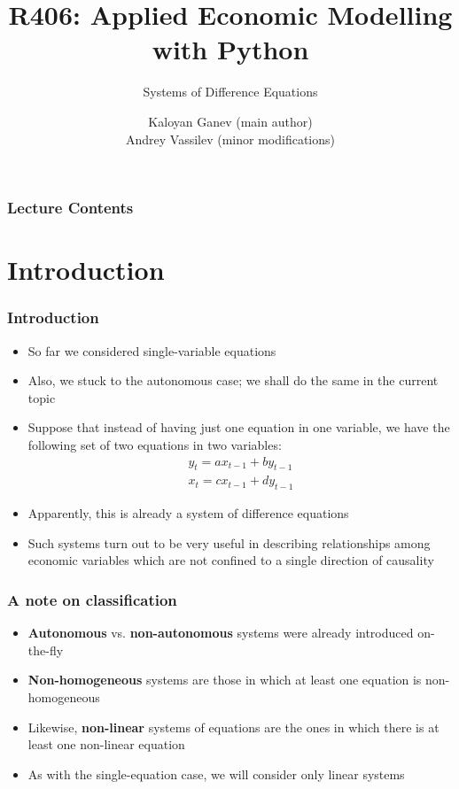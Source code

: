 \documentclass[10pt,usenames,dvipsnames]{beamer}
\title{R406: Applied Economic Modelling with Python}
\subtitle{\textcolor{myred}{Systems of Difference Equations}}
\author[Kaloyan Ganev,  Andrey Vassilev]{Kaloyan Ganev (main author) \\
	Andrey Vassilev (minor modifications)}
\date{}
\theoremstyle{definition}
\begin{document}
\maketitle

\begin{frame}[fragile]
\frametitle{Lecture Contents}
\tableofcontents
\end{frame}

\section{Introduction}
\begin{frame}[fragile]
\frametitle{Introduction}
\begin{itemize}
	\item So far we considered single-variable equations
	\item Also, we stuck to the autonomous case; we shall do the same in the current topic
	\item Suppose that instead of having just one equation in one variable, we have the following set of two equations in two variables:
	\[
		\begin{array}{lcl}
			y_{t} = ax_{t-1} + b y_{t-1}\\
			x_{t} = cx_{t-1} + d y_{t-1}
		\end{array}
	\]
	\item Apparently, this is already a system of difference equations
	\item Such systems turn out to be very useful in describing relationships among economic variables which are not confined to a single direction of causality
\end{itemize}
\end{frame}

\begin{frame}[fragile]
\frametitle{A note on classification}
\begin{itemize}
	\item \textbf{Autonomous} vs. \textbf{non-autonomous} systems were already introduced on-the-fly
	\item \textbf{Non-homogeneous} systems are those in which at least one equation is non-homogeneous
	\item Likewise, \textbf{non-linear} systems of equations are the ones in which there is at least one non-linear equation
	\item As with the single-equation case, we will consider only linear systems
\end{itemize}
\end{frame}
\end{document}
